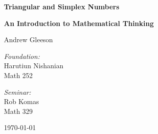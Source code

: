 \begin{titlepage}
\begin{center}


\vspace*{3cm}


{ \huge \bfseries Triangular and Simplex Numbers \\[1cm] }

{ \large \bfseries An Introduction to Mathematical Thinking \\[3cm] }

{ \large Andrew Gleeson \\[3cm] }

\begin{minipage}{0.4\textwidth}
\begin{flushleft} \large
\emph{Foundation:}\\[0.5cm]
Harutiun Nishanian\\[0.5cm]
Math 252
\end{flushleft}
\end{minipage}
\begin{minipage}{0.4\textwidth}
\begin{flushright} \large
\emph{Seminar:} \\[0.5cm]
Rob Komas\\[0.5cm]
Math 329
\end{flushright}
\end{minipage}

\vfill

{\large \today}

\end{center}
\end{titlepage}